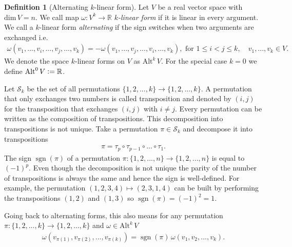 \documentclass[12pt,a4paper]{article}
\numberwithin{equation}{subsection}
\numberwithin{lemma}{subsection}
\theoremstyle{definition}
\newtheorem{definition}[lemma]{Definition}
\DeclareMathOperator{\sgn}{sgn}
\newcommand{\alternating}[2]{ {\text{Alt}^{#1}\,#2} }
\newcommand{\real}{\mathbb{R}}
\begin{document}
\begin{definition}[Alternating $k$-linear form]
    Let $V$ be a real vector space with $\text{dim}\,V = n$.
    We call map $\omega: V^k \rightarrow \real$ 
    \textit{$k$-linear form} if it is linear in every argument.
    We call a $k$-linear form 
    \textit{alternating} if the sign switches when two arguments are exchanged 
    i.e.
    \begin{align*}
        \omega(v_1,...,v_i,...,v_j,...,v_k)
        = - \omega(v_1,...,v_j,...,v_i,...,v_k), \text{ for } 1\leq i < j \leq k,
        \quad v_1,...,v_k \in V.
    \end{align*}
    We denote the space $k$-linear forms on $V$ as $\alternating{k}{V}$.
    For the special case $k=0$ we define $\alternating{0}{V} \vcentcolon= \real$.
\end{definition}

Let $\mathcal{S}_k$ be the set of all permutations 
$\{ 1, 2, ..., k\} \rightarrow \{ 1, 2, ..., k \}$. A 
permutation that only exchanges two numbers is called transposition 
and denoted by $(i,j)$ for the transposition that exchanges $(i,j)$ with 
$i \neq j$. Every permutation can be written as the composition of 
transpositions. This decomposition into transpositions is not unique.
Take a permutation $\pi \in \mathcal{S}_k$ and decompose it into transpositions
\begin{align*}
    \pi = \tau_p \circ \tau_{p-1} \circ ... \circ \tau_1.
\end{align*}
The sign $\sgn(\pi)$ of a permutation 
$\pi: \{ 1,2,...,n\} \rightarrow \{ 1,2, ..., n\}$ is equal to $(-1)^p$.
Even though the decomposition is not unique the parity of the number of
transpositions is always the same and hence the sign is well-defined.
For example, the permutation $(1,2,3,4) \mapsto (2,3,1,4)$ 
can be built by performing the transpositions $(1,2)$ and $(1,3)$ so 
$\sgn(\pi) = (-1)^2 = 1$. 

Going back to alternating forms, this also means for any permutation 
$\pi: \{1,2,...,k\} \rightarrow \{1,2,...,k\}$ and 
$\omega \in \alternating{k}{V}$
\begin{align*}
    \omega(v_{\pi(1)},v_{\pi(2)},...,v_{\pi(k)})
    = \sgn(\pi)\, \omega(v_1, v_2,..., v_k).
\end{align*}
\end{document}
